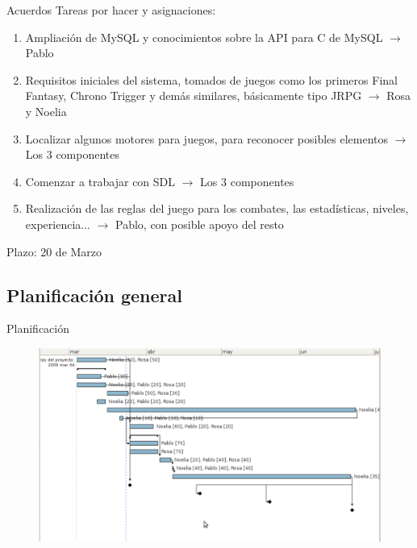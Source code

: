 \documentclass[9pt,xcolor=svgnames]{beamer}
\begin{document}
  \begin{frame}{Acuerdos}
   \transdissolve
   Tareas por hacer y asignaciones:
   
   \begin{enumerate}
    \item Ampliación de MySQL y conocimientos sobre la API para C de
	  MySQL $\longrightarrow$ Pablo
    \item Requisitos iniciales del sistema, tomados de juegos como los
	  primeros Final Fantasy, Chrono Trigger y demás similares,
	  básicamente tipo JRPG $\longrightarrow$ Rosa y Noelia
    \item Localizar algunos motores para juegos, para reconocer posibles
	  elementos $\longrightarrow$ Los 3 componentes
    \item Comenzar a trabajar con SDL $\longrightarrow$ Los 3
	  componentes
    \item Realización de las reglas del juego para los combates, las
	  estadísticas, niveles, experiencia... $\longrightarrow$ Pablo,
	  con posible apoyo del resto
   \end{enumerate}
   Plazo: 20 de Marzo
  \end{frame}

  \subsection{Planificación general}

  \begin{frame}{Planificación}
   \transdissolve
   
   \begin{figure}[t]
    \includegraphics[scale=0.27]{./Imagenes/gannt.pdf}
   \end{figure}
  \end{frame}
    
\end{document}
